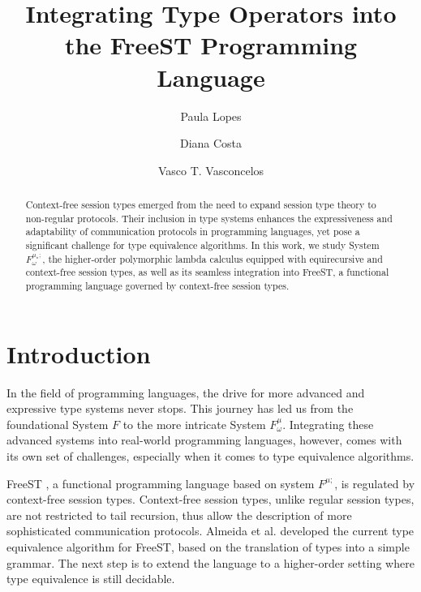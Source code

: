 \documentclass[runningheads,dvipsnames]{llncs}
\begin{document}
%
\title{Integrating Type Operators into the FreeST Programming Language}
%
%
\author{Paula Lopes \and
Diana Costa \and
Vasco T. Vasconcelos}

%
%
%
\maketitle              %
%
\begin{abstract}
Context-free session types emerged from the need to expand session type theory to non-regular protocols. Their inclusion in type systems enhances the expressiveness and adaptability of communication protocols in programming languages, yet pose a significant challenge for type equivalence algorithms. In this work, we study System $F^{\mu_*;}_\omega$, the higher-order polymorphic lambda calculus equipped with equirecursive and context-free session types, as well as its seamless integration into FreeST, a functional programming language governed by context-free session types.


\end{abstract}

\section{Introduction}
In the field of programming languages, the drive for more advanced and expressive type systems never stops. This journey has led us from the foundational System $F$\cite{DBLP:conf/programm/Reynolds74} to the more intricate System $F^{\mu}_\omega$\cite{DBLP:conf/popl/CaiGO16}. Integrating these advanced systems into real-world programming languages, however, comes with its own set of challenges, especially when it comes to type equivalence algorithms.

FreeST \cite{AlmeidaMTV22}, a functional programming language based on system $F^{\mu;}$, is regulated by context-free session types. Context-free session types, unlike regular session types, are not restricted to tail recursion, thus allow the description of more sophisticated communication protocols. Almeida et al. \cite{AlmeidaMV20} developed the current type equivalence algorithm for FreeST, based on the translation of types into a simple grammar. The next step is to extend the language to a higher-order setting where type equivalence is still decidable.
\end{document}
